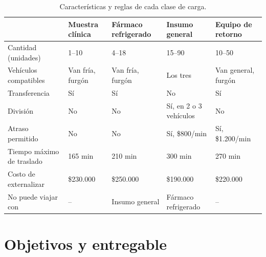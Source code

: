 \begin{table}[htbp]
\centering
\caption{Características y reglas de cada clase de carga.}\label{tab:clases}
\small
\begin{tabularx}{\textwidth}{lYYYY}
\toprule
 & Muestra clínica & Fármaco refrigerado & Insumo general & Equipo de retorno \\
\midrule
Cantidad (unidades) & 1--10 & 4--18 & 15--90 & 10--50 \\
Vehículos compatibles & Van fría, furgón & Van fría, furgón & Los tres & Van general, furgón \\
Transferencia & Sí & Sí & No & Sí \\
División & No & No & Sí, en 2 o 3 vehículos & No \\
Atraso permitido & No & No & Sí, \$800/min & Sí, \$1.200/min \\
Tiempo máximo de traslado & 165 min & 210 min & 300 min & 270 min \\
Costo de externalizar & \$230.000 & \$250.000 & \$190.000 & \$220.000 \\
No puede viajar con & -- & Insumo general & Fármaco refrigerado & -- \\
\bottomrule
\end{tabularx}
\end{table}

\section{Objetivos y entregable}\label{sec:objetivos}

